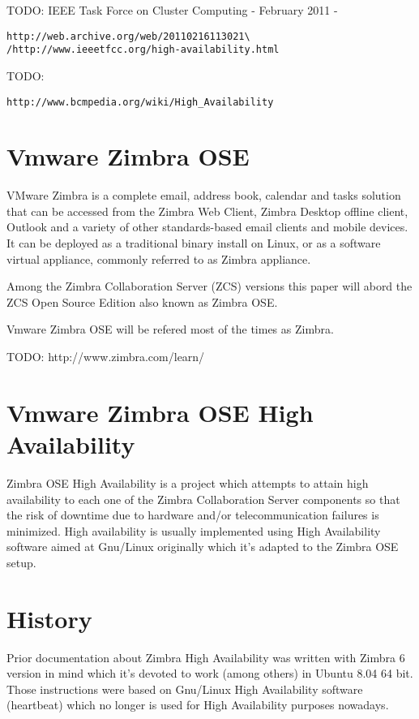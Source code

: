 TODO: IEEE Task Force on Cluster Computing - February 2011 -
\begin{verbatim}
http://web.archive.org/web/20110216113021\
/http://www.ieeetfcc.org/high-availability.html
\end{verbatim}

TODO:
\begin{verbatim}
http://www.bcmpedia.org/wiki/High_Availability
\end{verbatim}



\section {Vmware Zimbra OSE}
VMware Zimbra is a complete email, address book, calendar and tasks solution that can be accessed from the Zimbra Web Client, Zimbra Desktop offline client, Outlook and a variety of other standards-based email clients and mobile devices. It can be deployed as a traditional binary install on Linux, or as a software virtual appliance, commonly referred to as Zimbra appliance.

Among the Zimbra Collaboration Server (ZCS) versions this paper will abord the ZCS Open Source Edition also known as Zimbra OSE.

Vmware Zimbra OSE will be refered most of the times as Zimbra.

TODO: http://www.zimbra.com/learn/

\section {Vmware Zimbra OSE High Availability}
Zimbra OSE High Availability is a project which attempts to attain high availability to each one of the Zimbra Collaboration Server components so that the risk of downtime due to hardware and/or telecommunication failures is minimized. High availability is usually implemented using High Availability software aimed at Gnu/Linux originally which it's adapted to the Zimbra OSE setup.


\section{History}

Prior documentation about Zimbra High Availability was written with Zimbra 6 version in mind which it's devoted to work (among others) in Ubuntu 8.04 64 bit. Those instructions were based on Gnu/Linux High Availability software (heartbeat) which no longer is used for High Availability purposes nowadays.


